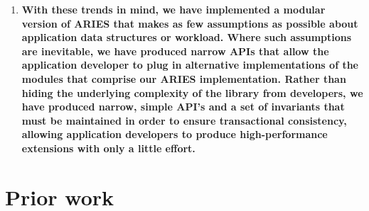 \documentclass[letterpaper,english]{article}
\begin{document}
\begin{enumerate}


  \item {\bf With these trends in mind, we have implemented a modular
  version of ARIES that makes as few assumptions as possible about
  application data structures or workload. Where such assumptions are
  inevitable, we have produced narrow APIs that allow the application
  developer to plug in alternative implementations of the modules that
  comprise our ARIES implementation. Rather than hiding the underlying
  complexity of the library from developers, we have produced narrow,
  simple API's and a set of invariants that must be maintained in
  order to ensure transactional consistency, allowing application
  developers to produce high-performance extensions with only a little
  effort.}

\end{enumerate}
\section{Prior work}
\end{document}

